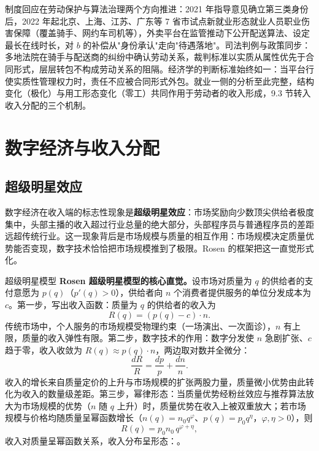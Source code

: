 制度回应在劳动保护与算法治理两个方向推进：2021 年指导意见确立第三类身份后，2022 年起北京、上海、江苏、广东等 7 省市试点新就业形态就业人员职业伤害保障（覆盖骑手、网约车司机等），外卖平台在监管推动下公开配送算法、设定最长在线时长，对 $b$ 的补偿从"身份承认"走向"待遇落地"。司法判例与政策同步：多地法院在骑手与配送商的纠纷中确认劳动关系，裁判标准以实质从属性优先于合同形式，层层转包不构成劳动关系的阻隔。经济学的判断标准始终如一：当平台行使实质性管理权力时，责任不应被合同形式外包。就业一侧的分析至此完整，结构变化（极化）与用工形态变化（零工）共同作用于劳动者的收入形成，9.3 节转入收入分配的三个机制。

\section{数字经济与收入分配}

\subsection{超级明星效应}

数字经济在收入端的标志性现象是\textbf{超级明星效应}：市场奖励向少数顶尖供给者极度集中，头部主播的收入超过行业总量的绝大部分，头部程序员与普通程序员的差距远超传统行业。这一现象背后是市场规模与质量的相互作用：市场规模决定质量优势能否变现，数字技术恰恰把市场规模推到了极限。Rosen 的框架把这一直觉形式化。

\begin{derivation}{超级明星模型}{}
\textbf{Rosen 超级明星模型的核心直觉。}设市场对质量为 $q$ 的供给者的支付意愿为 $p(q)$（$p'(q) > 0$），供给者向 $n$ 个消费者提供服务的单位分发成本为 $c$。第一步，写出收入函数：质量为 $q$ 的供给者的收入为
\[
R(q) = (p(q) - c) \cdot n.
\]
传统市场中，个人服务的市场规模受物理约束（一场演出、一次面诊），$n$ 有上限，质量的收入弹性有限。第二步，数字技术的作用：数字分发使 $n$ 急剧扩张、$c$ 趋于零，收入收敛为 $R(q) \approx p(q) \cdot n$，两边取对数并全微分：
\[
\frac{dR}{R} = \frac{dp}{p} + \frac{dn}{n}.
\]
收入的增长来自质量定价的上升与市场规模的扩张两股力量，质量微小优势由此转化为收入的数量级差距。第三步，幂律形态：当质量优势经粉丝效应与推荐算法放大为市场规模的优势（$n$ 随 $q$ 上升）时，质量优势在收入上被双重放大；若市场规模与价格均随质量呈幂函数增长（$n(q) = n_0 q^{\varphi}$、$p(q) = p_0 q^{\eta}$，$\varphi, \eta > 0$），则
\[
R(q) = p_0 n_0\, q^{\varphi + \eta},
\]
收入对质量呈幂函数关系，收入分布呈形态：。
\end{derivation}

